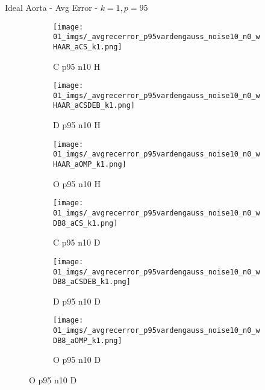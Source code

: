\begin{frame}{Ideal Aorta - Avg Error - $k=1,p=95$}{}
\begin{figure}
\begin{subfigure}{0.13\textwidth}
\texttt{[image: 01\_imgs/\_avgrecerror\_p95vardengauss\_noise10\_n0\_wHAAR\_aCS\_k1.png]}
\caption*{\tiny C p95 n10 H}
\end{subfigure}
\begin{subfigure}{0.13\textwidth}
\texttt{[image: 01\_imgs/\_avgrecerror\_p95vardengauss\_noise10\_n0\_wHAAR\_aCSDEB\_k1.png]}
\caption*{\tiny D p95 n10 H}
\end{subfigure}
\begin{subfigure}{0.13\textwidth}
\texttt{[image: 01\_imgs/\_avgrecerror\_p95vardengauss\_noise10\_n0\_wHAAR\_aOMP\_k1.png]}
\caption*{\tiny O p95 n10 H}
\end{subfigure}
\begin{subfigure}{0.13\textwidth}
\texttt{[image: 01\_imgs/\_avgrecerror\_p95vardengauss\_noise10\_n0\_wDB8\_aCS\_k1.png]}
\caption*{\tiny C p95 n10 D}
\end{subfigure}
\begin{subfigure}{0.13\textwidth}
\texttt{[image: 01\_imgs/\_avgrecerror\_p95vardengauss\_noise10\_n0\_wDB8\_aCSDEB\_k1.png]}
\caption*{\tiny D p95 n10 D}
\end{subfigure}
\begin{subfigure}{0.13\textwidth}
\texttt{[image: 01\_imgs/\_avgrecerror\_p95vardengauss\_noise10\_n0\_wDB8\_aOMP\_k1.png]}
\caption*{\tiny O p95 n10 D}
\end{subfigure}

\vspace{5pt}


\end{figure}
\end{frame}
